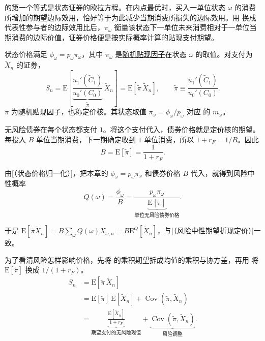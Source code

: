  的第一个等式是状态证券的欧拉方程。在内点最优时，买入一单位状态 $\omega$ 的消费所增加的期望边际效用，恰好等于为此减少当期消费所损失的边际效用。用 换成代表性参与者的边际效用比后，$\pi_\omega$ 衡量该状态下一单位未来消费相对于一单位当期消费的边际价值，证券价格便是按实际概率计算的贴现支付期望。

\begin{tcolorbox}[knowledge,title=消费定价公式]
状态价格满足 $\phi_\omega=p_\omega \pi_\omega$，其中 $\pi_\omega$ 是\hyperlink{wj-stochastic-discount-factor}{\textcolor{WJReferenceColor}{随机贴现因子}}在状态 $\omega$ 的取值。对支付为 $\widetilde X_n$ 的证券，
\begin{equation}
 S_n=\mathrm E\!\left[
   \underbrace{\frac{u_1'(\widetilde C_1)}{u_0'(C_0)}}_{\widetilde\pi}
   \,\widetilde X_n
 \right]
 =\mathrm E[\widetilde\pi\,\widetilde X_n],\qquad
 \widetilde\pi\equiv\frac{u_1'(\widetilde C_1)}{u_0'(C_0)}.
 \label{eq:wj-10-16}
\end{equation}
$\widetilde\pi$ 为随机贴现因子，也称定价核。其状态取值 $\pi_\omega=\phi_\omega/p_\omega$ 对应 的 $m_\omega$。
\end{tcolorbox}

无风险债券在每个状态都支付 $1$。将这个支付代入，债券价格就是定价核的期望。每投入 $B$ 单位当期消费，下一期确定收到 $1$ 单位消费，所以 $1+r_F=1/B$。因此
\begin{equation}
 B=\mathrm E[\widetilde\pi]=\frac1{1+r_F}.
 \label{eq:wj-10-17}
\end{equation}

由[（状态价格归一化）]，把本章的 $\phi_\omega=p_\omega \pi_\omega$ 和债券价格 $B$ 代入，就得到风险中性概率
\[
 Q(\omega)=\frac{\phi_\omega}{B}
 =\frac{p_\omega \pi_\omega}{\underbrace{\mathrm E[\widetilde\pi]}_{\text{单位无风险债券价格}}}.
\]

于是 $\mathrm E[\widetilde\pi\widetilde X_n]=B\sum_\omega Q(\omega)X_{\omega,n}=B\mathrm E^Q[\widetilde X_n]$，与[（风险中性期望折现定价）]一致。

为了看清风险怎样影响价格，先将 的乘积期望拆成均值的乘积与协方差，再用 将 $\mathrm E[\widetilde\pi]$ 换成 $1/(1+r_F)$。
\begin{equation}
 \begin{aligned}
 S_n&=\mathrm E[\widetilde\pi\,\widetilde X_n]\\
 &=\mathrm E[\widetilde\pi]\,\mathrm E[\widetilde X_n]
   +\operatorname{Cov}(\widetilde\pi,\widetilde X_n)\\
 &=\underbrace{\frac{\mathrm E[\widetilde X_n]}{1+r_F}}_{\text{期望支付的无风险现值}}
   +\underbrace{\operatorname{Cov}(\widetilde\pi,\widetilde X_n)}_{\text{风险调整}}.
 \end{aligned}
 \label{eq:wj-10-18}
\end{equation}

